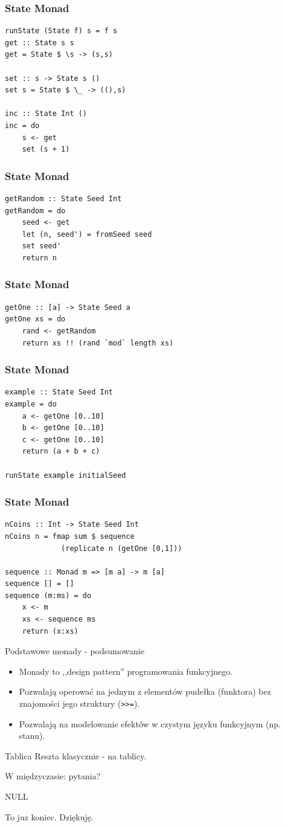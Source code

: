 \documentclass[14pt]{beamer}
\begin{document}
\begin{frame}[fragile]
\frametitle{State Monad}
\begin{verbatim}
runState (State f) s = f s
get :: State s s
get = State $ \s -> (s,s)

set :: s -> State s ()
set s = State $ \_ -> ((),s)

inc :: State Int ()
inc = do
    s <- get
    set (s + 1)
\end{verbatim}
\end{frame}

\begin{frame}[fragile]
\frametitle{State Monad}
\begin{verbatim}
getRandom :: State Seed Int
getRandom = do
    seed <- get
    let (n, seed') = fromSeed seed
    set seed'
    return n
\end{verbatim}
\end{frame}

\begin{frame}[fragile]
\frametitle{State Monad}
\begin{verbatim}
getOne :: [a] -> State Seed a
getOne xs = do
    rand <- getRandom
    return xs !! (rand `mod` length xs)
\end{verbatim}
\end{frame}

\begin{frame}[fragile]
\frametitle{State Monad}
\begin{verbatim}
example :: State Seed Int
example = do
    a <- getOne [0..10]
    b <- getOne [0..10]
    c <- getOne [0..10]
    return (a + b + c)

runState example initialSeed
\end{verbatim}
\end{frame}

\begin{frame}[fragile]
\frametitle{State Monad}
\begin{verbatim}
nCoins :: Int -> State Seed Int
nCoins n = fmap sum $ sequence 
             (replicate n (getOne [0,1]))

sequence :: Monad m => [m a] -> m [a]
sequence [] = []
sequence (m:ms) = do
    x <- m
    xs <- sequence ms
    return (x:xs)
\end{verbatim}
\end{frame}

\begin{frame}{Podstawowe monady - podsumowanie}
    \begin{itemize}
        \item Monady to ,,design pattern'' programowania funkcyjnego.
        \item Pozwalają operować na jednym z elementów pudełka (funktora) bez
            znajomości jego struktury (\texttt{>>=}).
        \item Pozwalają na modelowanie efektów w czystym języku funkcyjnym (np. stanu).
    \end{itemize}
\end{frame}

\begin{frame}{Tablica}
    Reszta klasycznie - na tablicy.

    W międzyczasie: pytania?
\end{frame}

\begin{frame}
    NULL
\end{frame}

\begin{frame}
    To juz koniec. Dziękuję.
\end{frame}
\end{document}
